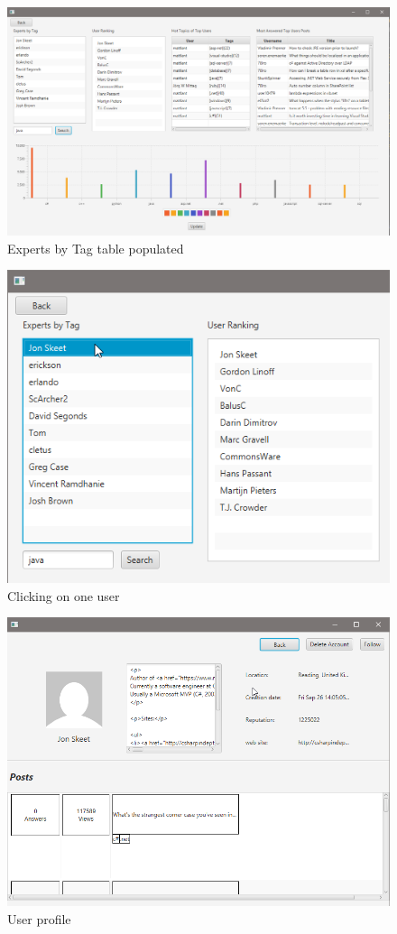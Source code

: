 \documentclass[11pt]{report}
\begin{document}
\begin{figure}[H]
  \centering
  \includegraphics[width=\textwidth,keepaspectratio=true]{img/user_manual/StatsAdmin3.png}
  \caption{Experts by Tag table populated}
  \label{fig:StatsAdmin3}
\end{figure}
\begin{figure}[H]
  \centering
  \includegraphics[width=\textwidth,keepaspectratio=true]{img/user_manual/StatsAdmin4.png}
  \caption{Clicking on one user}
  \label{fig:StatsAdmin4}
\end{figure}
\begin{figure}[H]
  \centering
  \includegraphics[width=\textwidth,keepaspectratio=true]{img/user_manual/StatsAdmin5.png}
  \caption{User profile}
  \label{fig:StatsAdmin5}
\end{figure}
\end{document}
